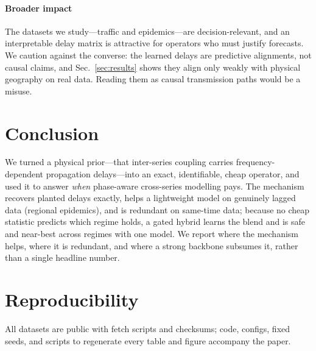 \documentclass[journal,a4paper]{IEEEtran}
\begin{document}
\paragraph{Broader impact} The datasets we study---traffic and epidemics---are decision-relevant,
and an interpretable delay matrix is attractive for operators who must justify forecasts. We
caution against the converse: the learned delays are predictive alignments, not causal claims, and
Sec.~\ref{sec:results} shows they align only weakly with physical geography on real data. Reading
them as causal transmission paths would be a misuse.

\section{Conclusion}
\label{sec:conclusion}
We turned a physical prior---that inter-series coupling carries frequency-dependent propagation
delays---into an exact, identifiable, cheap operator, and used it to answer \emph{when} phase-aware
cross-series modelling pays. The mechanism recovers planted delays exactly, helps a lightweight
model on genuinely lagged data (regional epidemics), and is redundant on same-time data; because no
cheap statistic predicts which regime holds, a gated hybrid learns the blend and is safe and
near-best across regimes with one model. We report where the mechanism helps, where it is
redundant, and where a strong backbone subsumes it, rather than a single headline number.

\section*{Reproducibility}
All datasets are public with fetch scripts and checksums; code, configs, fixed seeds, and scripts
to regenerate every table and figure accompany the paper.



\end{document}
